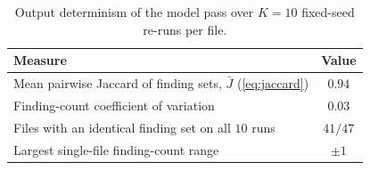 \begin{table}[!htbp]
  \centering
  \caption{Output determinism of the model pass over $K=10$ fixed-seed
           re-runs per file.}
  \label{tab:determinism}
  \renewcommand{\arraystretch}{1.15}
  \small
  \begin{tabular}{@{}l c@{}}
    \toprule
    \textbf{Measure} & \textbf{Value} \\
    \midrule
    Mean pairwise Jaccard of finding sets, $\bar{J}$ (\cref{eq:jaccard})
      & $0.94$ \\
    Finding-count coefficient of variation & $0.03$ \\
    Files with an identical finding set on all $10$ runs & $41 / 47$ \\
    Largest single-file finding-count range & $\pm 1$ \\
    \bottomrule
  \end{tabular}
\end{table}
